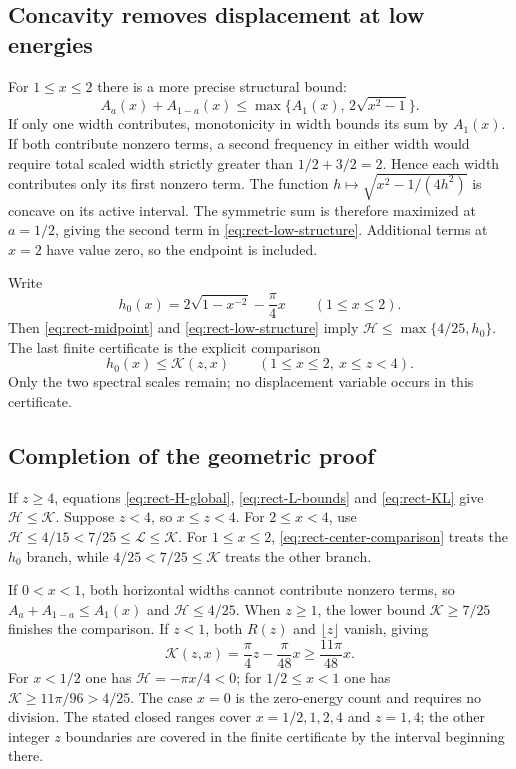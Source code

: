 \documentclass[11pt,reqno]{amsart}
\numberwithin{equation}{section}
\begin{document}
\subsection*{Concavity removes displacement at low energies}

For $1\le x\le2$ there is a more precise structural bound:
\begin{equation}\label{eq:rect-low-structure}
 A_a(x)+A_{1-a}(x)
 \le\max\{A_1(x),\,2\sqrt{x^2-1}\}.
\end{equation}
If only one width contributes, monotonicity in width bounds its
sum by $A_1(x)$. If both contribute nonzero terms, a second
frequency in either width would require total scaled width
strictly greater than $1/2+3/2=2$. Hence each width contributes
only its first nonzero term. The function
$h\mapsto\sqrt{x^2-1/(4h^2)}$ is concave on its active
interval. The symmetric sum is therefore maximized at
$a=1/2$, giving the second term in
\eqref{eq:rect-low-structure}. Additional terms at $x=2$ have
value zero, so the endpoint is included.

Write
\[
 h_0(x)=2\sqrt{1-x^{-2}}-\frac\pi4x\qquad(1\le x\le2).
\]
Then \eqref{eq:rect-midpoint} and
\eqref{eq:rect-low-structure} imply
$\mathcal H\le\max\{4/25,h_0\}$. The last finite
certificate is the explicit comparison
\begin{equation}\label{eq:rect-center-comparison}
 h_0(x)\le\mathcal K(z,x)
 \qquad(1\le x\le2,\ x\le z<4).
\end{equation}
Only the two spectral scales remain; no displacement variable
occurs in this certificate.

\subsection*{Completion of the geometric proof}

If $z\ge4$, equations \eqref{eq:rect-H-global},
\eqref{eq:rect-L-bounds} and \eqref{eq:rect-KL} give
$\mathcal H\le\mathcal K$. Suppose $z<4$, so $x\le z<4$.
For $2\le x<4$, use $\mathcal H\le4/15<7/25\le
\mathcal L\le\mathcal K$. For $1\le x\le2$,
\eqref{eq:rect-center-comparison} treats the $h_0$ branch,
while $4/25<7/25\le\mathcal K$ treats the other branch.

If $0<x<1$, both horizontal widths cannot contribute nonzero
terms, so $A_a+A_{1-a}\le A_1(x)$ and
$\mathcal H\le4/25$. When $z\ge1$, the lower bound
$\mathcal K\ge7/25$ finishes the comparison. If $z<1$,
both $R(z)$ and $\lfloor z\rfloor$ vanish, giving
\[
 \mathcal K(z,x)=\frac\pi4z-\frac\pi{48}x
 \ge\frac{11\pi}{48}x.
\]
For $x<1/2$ one has $\mathcal H=-\pi x/4<0$; for
$1/2\le x<1$ one has $\mathcal K\ge11\pi/96>4/25$.
The case $x=0$ is the zero-energy count and requires no division.
The stated closed ranges cover $x=1/2,1,2,4$ and $z=1,4$;
the other integer $z$ boundaries are covered in the finite
certificate by the interval beginning there.
\end{document}
